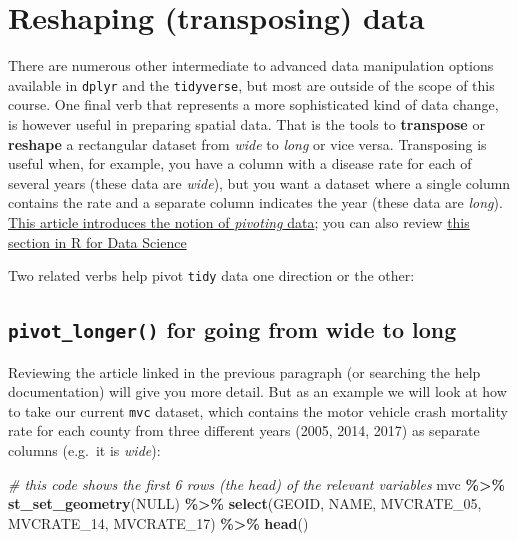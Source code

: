 \documentclass[
]{book}
\newenvironment{Shaded}{\begin{snugshade}}{\end{snugshade}}
\newcommand{\CommentTok}[1]{\textcolor[rgb]{0.56,0.35,0.01}{\textit{#1}}}
\newcommand{\ConstantTok}[1]{\textcolor[rgb]{0.56,0.35,0.01}{#1}}
\newcommand{\FunctionTok}[1]{\textcolor[rgb]{0.13,0.29,0.53}{\textbf{#1}}}
\newcommand{\NormalTok}[1]{#1}
\newcommand{\SpecialCharTok}[1]{\textcolor[rgb]{0.81,0.36,0.00}{\textbf{#1}}}
\begin{document}
\hypertarget{pivot_}{%
\section{Reshaping (transposing) data}\label{pivot_}}

There are numerous other intermediate to advanced data manipulation options available in \texttt{dplyr} and the \texttt{tidyverse}, but most are outside of the scope of this course. One final verb that represents a more sophisticated kind of data change, is however useful in preparing spatial data. That is the tools to \textbf{transpose} or \textbf{reshape} a rectangular dataset from \emph{wide} to \emph{long} or vice versa. Transposing is useful when, for example, you have a column with a disease rate for each of several years (these data are \emph{wide}), but you want a dataset where a single column contains the rate and a separate column indicates the year (these data are \emph{long}). \href{https://tidyr.tidyverse.org/articles/pivot.html}{This article introduces the notion of \emph{pivoting} data}; you can also review \href{https://r4ds.had.co.nz/tidy-data.html\#pivoting}{this section in R for Data Science}

Two related verbs help pivot \texttt{tidy} data one direction or the other:

\hypertarget{pivot_longer-for-going-from-wide-to-long}{%
\subsection{\texorpdfstring{\texttt{pivot\_longer()} for going from wide to long}{pivot\_longer() for going from wide to long}}\label{pivot_longer-for-going-from-wide-to-long}}

Reviewing the article linked in the previous paragraph (or searching the help documentation) will give you more detail. But as an example we will look at how to take our current \texttt{mvc} dataset, which contains the motor vehicle crash mortality rate for each county from three different years (2005, 2014, 2017) as separate columns (e.g.~it is \emph{wide}):

\begin{Shaded}
\begin{Highlighting}[]
\CommentTok{\# this code shows the first 6 rows (the head) of the relevant variables}
\NormalTok{mvc }\SpecialCharTok{\%\textgreater{}\%} 
  \FunctionTok{st\_set\_geometry}\NormalTok{(}\ConstantTok{NULL}\NormalTok{) }\SpecialCharTok{\%\textgreater{}\%}
  \FunctionTok{select}\NormalTok{(GEOID, NAME, MVCRATE\_05, MVCRATE\_14, MVCRATE\_17) }\SpecialCharTok{\%\textgreater{}\%}
  \FunctionTok{head}\NormalTok{()}
\end{Highlighting}
\end{Shaded}
\end{document}
